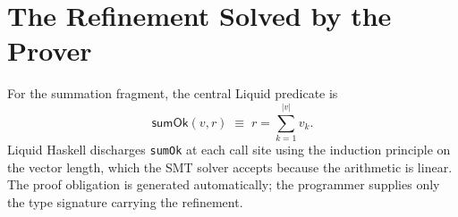 \section{The Refinement Solved by the Prover}
\label{sec:liquid-solve}

For the summation fragment, the central Liquid predicate is
\[
\mathsf{sumOk}(v, r) \;\equiv\; r = \sum_{k=1}^{|v|} v_k.
\]
Liquid Haskell discharges \texttt{sumOk} at each call site using the
induction principle on the vector length, which the SMT solver accepts
because the arithmetic is linear. The proof obligation is generated
automatically; the programmer supplies only the type signature carrying
the refinement.
